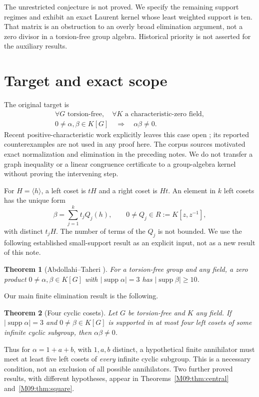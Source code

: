 \documentclass[11pt,a4paper,oneside]{report}
\newtheorem{theorem}{Theorem}[section]
\theoremstyle{definition}
\theoremstyle{remark}
\DeclareMathOperator{\supp}{supp}
\begin{document}
The unrestricted conjecture is not proved. We specify the remaining
support regimes and exhibit an exact Laurent kernel whose least
weighted support is ten. That matrix is an obstruction to an overly
broad elimination argument, not a zero divisor in a torsion-free
group algebra. Historical priority is not asserted for the auxiliary
results.
\medskip
\section{Target and exact scope}
The original target is
\begin{equation}\label{M09:eq:target}
\begin{gathered}
\forall G\text{ torsion-free},\quad
\forall K\text{ a characteristic-zero field},\\
0\ne\alpha,\beta\in K[G]\quad\Longrightarrow\quad\alpha\beta\ne0.
\end{gathered}
\end{equation}
Recent positive-characteristic work explicitly leaves this case open
\cite{B:Ivanov}; its reported counterexamples are not used in any proof
here. The corpus sources \cite{B:Corpus} motivated exact normalization
and elimination in the preceding notes. We do not transfer a graph
inequality or a linear congruence certificate to a group-algebra
kernel without proving the intervening step.

For $H=\langle h\rangle$, a left coset is $tH$ and a right coset is
$Ht$. An element in $k$ left cosets has the unique form
\[
\beta=\sum_{j=1}^k t_j Q_j(h),\qquad
0\ne Q_j\in R:=K[z,z^{-1}],
\]
with distinct $t_jH$. The number of terms of the $Q_j$ is not bounded.
We use the following established small-support result as an explicit
input, not as a new result of this note.

\begin{theorem}[Abdollahi--Taheri \cite{B:ATsmall}]\label{M09:thm:AT}
For a torsion-free group and any field, a zero product
$0\ne\alpha,\beta\in K[G]$ with $|\supp\alpha|=3$ has
$|\supp\beta|\ge10$.
\end{theorem}

Our main finite elimination result is the following.
\begin{theorem}[Four cyclic cosets]\label{M09:thm:four}
Let $G$ be torsion-free and $K$ any field. If
$|\supp\alpha|=3$ and $0\ne\beta\in K[G]$ is supported in at most
four left cosets of some infinite cyclic subgroup, then
$\alpha\beta\ne0$.
\end{theorem}
Thus for $\alpha=1+a+b$, with $1,a,b$ distinct, a hypothetical
finite annihilator must meet at least five left cosets of \emph{every}
infinite cyclic subgroup. This is a necessary condition, not an
exclusion of all possible annihilators. Two further proved results,
with different hypotheses, appear in Theorems~\ref{M09:thm:central}
and~\ref{M09:thm:square}.
\end{document}
